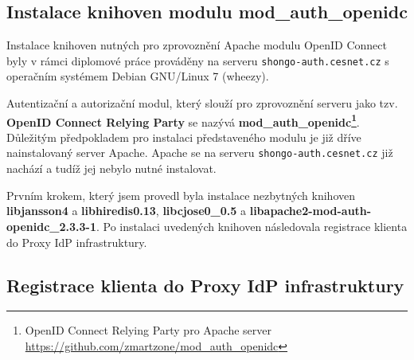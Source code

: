 \documentclass[
  printed, %
  twoside, %
  table,   %
  nolof,     %
  nolot,     %
]{fithesis3}
\begin{document}
\label{apacheConfig}
\subsection{Instalace knihoven modulu mod\_auth\_openidc}
Instalace knihoven nutných pro zprovoznění Apache modulu OpenID Connect byly v rámci diplomové práce prováděny na serveru \texttt{shongo-auth.cesnet.cz} s operačním systémem Debian GNU/Linux 7 (wheezy). 
\par 
Autentizační a autorizační modul, který slouží pro zprovoznění serveru jako tzv. \textbf{OpenID Connect Relying Party} se nazývá \textbf{mod\_auth\_openidc\footnote{OpenID Connect Relying Party pro Apache server \url{https://github.com/zmartzone/mod\_auth\_openidc}}}. Důležitým předpokladem pro instalaci představeného modulu je již dříve nainstalovaný server Apache. Apache se na serveru \texttt{shongo-auth.cesnet.cz} již nachází a tudíž jej nebylo nutné instalovat. 
\par 
Prvním krokem, který jsem provedl byla instalace nezbytných knihoven \textbf{libjansson4} a \textbf{libhiredis0.13}, \textbf{libcjose0\_0.5} a \textbf{libapache2-mod-auth-openidc\_2.3.3-1}. Po instalaci uvedených knihoven následovala registrace klienta do Proxy IdP infrastruktury. 

\subsection{Registrace klienta do Proxy IdP infrastruktury}
\end{document}
